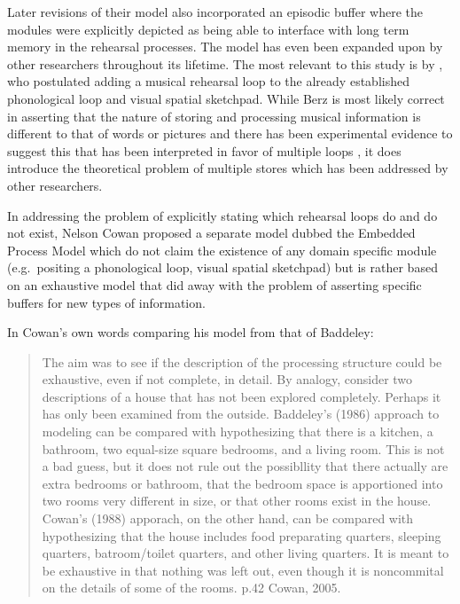 \documentclass[]{book}
\begin{document}
Later revisions of their model also incorporated an episodic buffer \citep{baddeleyEpisodicBufferNew2000} where the modules were explicitly depicted as being able to interface with long term memory in the rehearsal processes.
The model has even been expanded upon by other researchers throughout its lifetime.
The most relevant to this study is by \citep{berzWorkingMemoryMusic1995}, who postulated adding a musical rehearsal loop to the already established phonological loop and visual spatial sketchpad.
While Berz is most likely correct in asserting that the nature of storing and processing musical information is different to that of words or pictures and there has been experimental evidence to suggest this \citep{williamsonMusiciansNonmusiciansShortterm2010} that has been interpreted in favor of multiple loops \citep{wollnerAttentionalFlexibilityMemory2016} , it does introduce the theoretical problem of multiple stores which has been addressed by other researchers.

In addressing the problem of explicitly stating which rehearsal loops do and do not exist, Nelson Cowan proposed a separate model \citep{cowanEvolvingConceptionsMemory1988, cowanWorkingMemoryCapacity2005} dubbed the Embedded Process Model which do not claim the existence of any domain specific module (e.g.~positing a phonological loop, visual spatial sketchpad) but is rather based on an exhaustive model that did away with the problem of asserting specific buffers for new types of information.

In Cowan's own words comparing his model from that of Baddeley:

\begin{quote}
The aim was to see if the description of the processing structure could be exhaustive, even if not complete, in detail. By analogy, consider two descriptions of a house that has not been explored completely. Perhaps it has only been examined from the outside. Baddeley's (1986) approach to modeling can be compared with hypothesizing that there is a kitchen, a bathroom, two equal-size square bedrooms, and a living room. This is not a bad guess, but it does not rule out the possibllity that there actually are extra bedrooms or bathroom, that the bedroom space is apportioned into two rooms very different in size, or that other rooms exist in the house. Cowan's (1988) apporach, on the other hand, can be compared with hypothesizing that the house includes food preparating quarters, sleeping quarters, batroom/toilet quarters, and other living quarters. It is meant to be exhaustive in that nothing was left out, even though it is noncommital on the details of some of the rooms. p.42 Cowan, 2005.
\end{quote}
\end{document}
